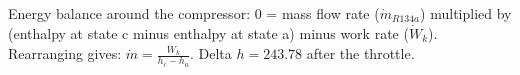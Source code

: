 Energy balance around the compressor:  
0 = mass flow rate (\( \dot{m}_{R134a} \)) multiplied by (enthalpy at state c minus enthalpy at state a) minus work rate (\( \dot{W}_k \)).  
Rearranging gives:  
\( \dot{m} = \frac{\dot{W}_k}{h_c - h_a} \).  
Delta \( h = 243.78 \) after the throttle.